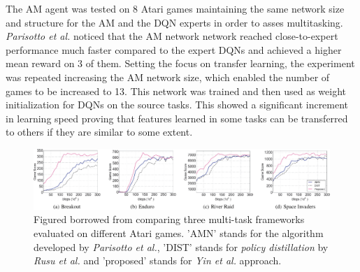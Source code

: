 \documentclass{article}
\begin{document}
The AM agent was tested on 8 Atari games maintaining the same network size and structure for the AM and the DQN experts in order to asses multitasking. \textit{Parisotto et al.} noticed that the AM network network reached close-to-expert performance much faster compared to the expert DQNs and achieved a higher mean reward on 3 of them. Setting the focus on transfer learning, the experiment was repeated increasing the AM network size, which enabled the number of games to be increased to 13. This network was trained and then used as weight initialization for DQNs on the source tasks. This showed a significant increment in learning speed proving that features learned in some tasks can be transferred to others if they are similar to some extent.\\
\newline
\begin{figure}[H]
    \centering
    \includegraphics[width=\textwidth]{comparison.png}
    \caption{Figured borrowed from \citep{YinKnowledgeReplay} comparing three multi-task frameworks evaluated on different Atari games. 'AMN' stands for the algorithm developed by \textit{Parisotto et al.}, 'DIST' stands for \textit{policy distillation} by \textit{Rusu et al.} and 'proposed' stands for \textit{Yin et al.} approach.}
    \label{fig:comparison}
\end{figure}
\end{document}
